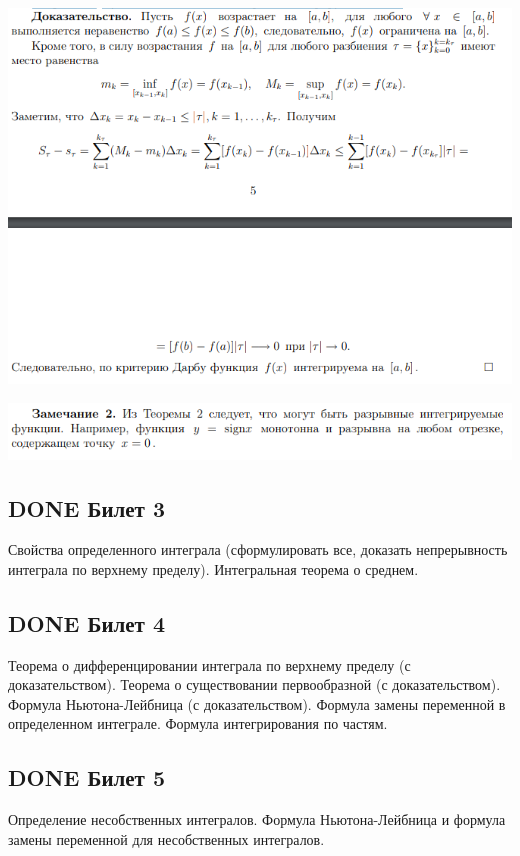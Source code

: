 \documentclass[11pt]{article}
\begin{document}
\begin{center}
\includegraphics[width=.9\linewidth]{img/b2-t4dok.png}
\end{center}

\begin{center}
\includegraphics[width=.9\linewidth]{img/b2-t4zam.png}
\end{center}

\subsection{{\bfseries\sffamily DONE} Билет 3}
\label{sec:orgdfa79ee}
Свойства определенного интеграла (сформулировать все, доказать непрерывность интеграла по верхнему пределу). Интегральная теорема о среднем.


\subsection{{\bfseries\sffamily DONE} Билет 4}
\label{sec:org5fe855e}
Теорема о дифференцировании интеграла по верхнему пределу (с доказательством).  Теорема о существовании первообразной (с доказательством). Формула Ньютона-Лейбница (с доказательством). Формула замены переменной в определенном интеграле. Формула интегрирования по частям.


\subsection{{\bfseries\sffamily DONE} Билет 5}
\label{sec:orga2e025c}
Определение несобственных интегралов.  Формула Ньютона-Лейбница и формула замены переменной для несобственных интегралов.

\end{document}
